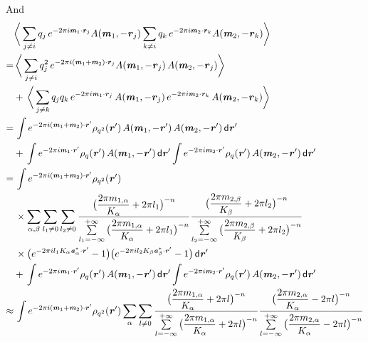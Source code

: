 \documentclass[aps,pre,preprint]{revtex4}
\renewcommand{\v}[1]{\textbf{\textit{#1}}}
\renewcommand{\d}[1]{\textsf{#1}}
\begin{document}
And 
\begin{align} \nonumber
  & \bigg\langle
  \sum_{j\neq i}q_j\,e^{-2\pi i\v m_1\cdot\v r_j}A(\v m_1, -\v r_j)
  \sum_{k\neq i}q_k\,e^{-2\pi i\v m_2\cdot\v r_k}A(\v m_2, -\v r_k)
  \bigg\rangle \\ \nonumber
  = &\,
  \bigg\langle
  \sum_{j\neq i}q^2_j\,e^{-2\pi i(\v m_1+\v m_2)\cdot\v r_j}A(\v m_1, -\v r_j)\,A(\v m_2, -\v r_j)
  \bigg\rangle \\ \nonumber
  &+ \,
  \bigg\langle
  \sum_{j\neq k}q_jq_k\,
  e^{-2\pi i\v m_1\cdot\v r_j}\,A(\v m_1, -\v r_j)\,
  e^{-2\pi i\v m_2\cdot\v r_k}\,A(\v m_2, -\v r_k)
  \bigg\rangle \\ \nonumber
  = &\,
  \int
  e^{-2\pi i (\v m_1 + \v m_2)\cdot\v r'}\rho_{q^2}(\v r')\,A(\v m_1,-\v r')\,A(\v m_2,-\v r')\,\d d\v r' \\\nonumber
  &+ \,
  \int
  e^{-2\pi i\v m_1\cdot\v r'}\rho_q(\v r')\,A(\v m_1,-\v r')\,\d d\v r'
  \int
  e^{-2\pi i\v m_2\cdot\v r'}\rho_q(\v r')\,A(\v m_2,-\v r') \,\d d\v r' \\\nonumber
  = &\,
  \int
  e^{-2\pi i (\v m_1 + \v m_2)\cdot\v r'}\rho_{q^2}(\v r') \\\nonumber
  &\,
  \times
  \sum_{\alpha, \beta}\sum_{l_1\neq 0}\sum_{l_2\neq 0}
  \frac
  {\big(\dfrac{2\pi m_{1,\alpha}}{K_\alpha} + 2\pi l_1\big)^{-n}}
  {\sum\limits_{l_1=-\infty}^{+\infty}
    \big(\dfrac{2\pi m_{1,\alpha}}{K_\alpha} + 2\pi l_1\big)^{-n}}
  \frac
  {\big(\dfrac{2\pi m_{2,\beta}}{K_\beta} + 2\pi l_2\big)^{-n}}
  {\sum\limits_{l_2=-\infty}^{+\infty}
    \big(\dfrac{2\pi m_{2,\beta}}{K_\beta} + 2\pi l_2\big)^{-n}} \\\nonumber
  &\,
  \times
  \big(
  e^{-2\pi i l_1 K_\alpha\v a^\ast_\alpha\cdot \v r'} - 1
  \big)
  \big(
  e^{-2\pi i l_2 K_\beta\v a^\ast_\beta\cdot \v r'} - 1
  \big)
  \,\d d\v r' \\\nonumber
  &+ \,
  \int
  e^{-2\pi i\v m_1\cdot\v r'}\rho_q(\v r')\,A(\v m_1,-\v r')\,\d d\v r'
  \int
  e^{-2\pi i\v m_2\cdot\v r'}\rho_q(\v r')\,A(\v m_2,-\v r') \,\d d\v r' \\\nonumber
  \approx &\,
  \int
  e^{-2\pi i (\v m_1 + \v m_2)\cdot\v r'}\rho_{q^2}(\v r') 
  \sum_{\alpha}\sum_{l\neq 0}
  \frac
  {\big(\dfrac{2\pi m_{1,\alpha}}{K_\alpha} + 2\pi l\big)^{-n}}
  {\sum\limits_{l=-\infty}^{+\infty}
    \big(\dfrac{2\pi m_{1,\alpha}}{K_\alpha} + 2\pi l\big)^{-n}}
  \frac
  {\big(\dfrac{2\pi m_{2,\alpha}}{K_\alpha} - 2\pi l\big)^{-n}}
  {\sum\limits_{l=-\infty}^{+\infty}
    \big(\dfrac{2\pi m_{2,\alpha}}{K_\alpha} - 2\pi l\big)^{-n}}

\end{align}
\end{document}
